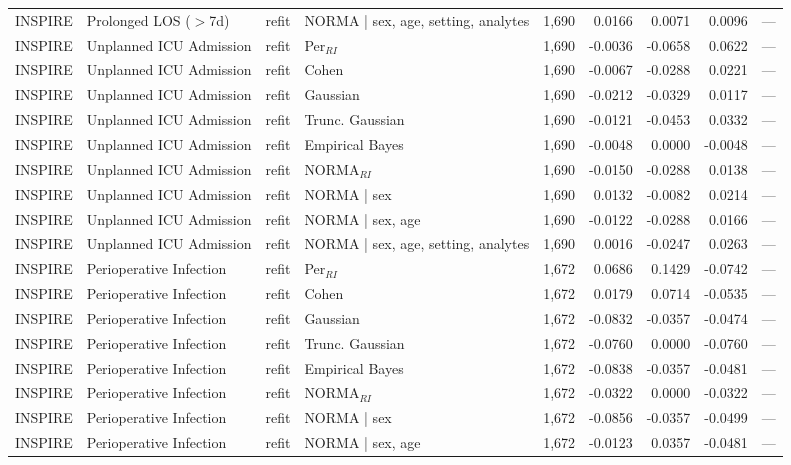 \begin{table}[ht]
\begin{tabular}{ll l l r r r r r}
INSPIRE & Prolonged LOS ($>$7d) & refit & NORMA | sex, age, setting, analytes & 1,690 & 0.0166 & 0.0071 & 0.0096 & --- \\
INSPIRE & Unplanned ICU Admission & refit & Per$_{RI}$ & 1,690 & -0.0036 & -0.0658 & 0.0622 & --- \\
INSPIRE & Unplanned ICU Admission & refit & Cohen & 1,690 & -0.0067 & -0.0288 & 0.0221 & --- \\
INSPIRE & Unplanned ICU Admission & refit & Gaussian & 1,690 & -0.0212 & -0.0329 & 0.0117 & --- \\
INSPIRE & Unplanned ICU Admission & refit & Trunc. Gaussian & 1,690 & -0.0121 & -0.0453 & 0.0332 & --- \\
INSPIRE & Unplanned ICU Admission & refit & Empirical Bayes & 1,690 & -0.0048 & 0.0000 & -0.0048 & --- \\
INSPIRE & Unplanned ICU Admission & refit & NORMA$_{RI}$ & 1,690 & -0.0150 & -0.0288 & 0.0138 & --- \\
INSPIRE & Unplanned ICU Admission & refit & NORMA | sex & 1,690 & 0.0132 & -0.0082 & 0.0214 & --- \\
INSPIRE & Unplanned ICU Admission & refit & NORMA | sex, age & 1,690 & -0.0122 & -0.0288 & 0.0166 & --- \\
INSPIRE & Unplanned ICU Admission & refit & NORMA | sex, age, setting, analytes & 1,690 & 0.0016 & -0.0247 & 0.0263 & --- \\
INSPIRE & Perioperative Infection & refit & Per$_{RI}$ & 1,672 & 0.0686 & 0.1429 & -0.0742 & --- \\
INSPIRE & Perioperative Infection & refit & Cohen & 1,672 & 0.0179 & 0.0714 & -0.0535 & --- \\
INSPIRE & Perioperative Infection & refit & Gaussian & 1,672 & -0.0832 & -0.0357 & -0.0474 & --- \\
INSPIRE & Perioperative Infection & refit & Trunc. Gaussian & 1,672 & -0.0760 & 0.0000 & -0.0760 & --- \\
INSPIRE & Perioperative Infection & refit & Empirical Bayes & 1,672 & -0.0838 & -0.0357 & -0.0481 & --- \\
INSPIRE & Perioperative Infection & refit & NORMA$_{RI}$ & 1,672 & -0.0322 & 0.0000 & -0.0322 & --- \\
INSPIRE & Perioperative Infection & refit & NORMA | sex & 1,672 & -0.0856 & -0.0357 & -0.0499 & --- \\
INSPIRE & Perioperative Infection & refit & NORMA | sex, age & 1,672 & -0.0123 & 0.0357 & -0.0481 & --- \\

\end{tabular}
\end{table}
